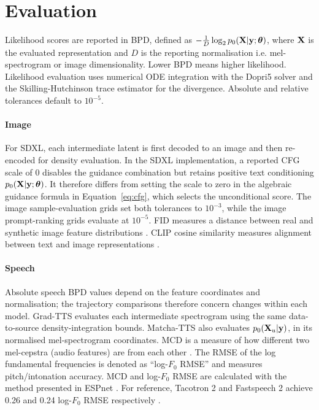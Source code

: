 \section{Evaluation}
Likelihood scores are reported in \ac{BPD}, defined as $-\frac{1}{D}\log_2 p_0({\mathbf{X}}|{\mathbf{y}};{\bm{\theta}})$, where ${\mathbf{X}}$ is the evaluated representation and $D$ is the reporting normalisation i.e. mel-spectrogram or image dimensionality. Lower \ac{BPD} means higher likelihood. 
Likelihood evaluation uses numerical \ac{ODE} integration with the Dopri5 solver and the Skilling-Hutchinson trace estimator for the divergence. Absolute and relative tolerances default to $10^{-5}$. 


\paragraph{Image}
For SDXL, each intermediate latent is first decoded to an image and then re-encoded for density evaluation. 
In the SDXL implementation, a reported \ac{CFG} scale of 0 disables the guidance combination but retains positive text conditioning $p_0({\mathbf{X}}|{\mathbf{y}};{\bm{\theta}})$. It therefore differs from setting the scale to zero in the algebraic guidance formula in Equation~\ref{eq:cfg}, which selects the unconditional score.
The image sample-evaluation grids set both tolerances to $10^{-3}$, while the image prompt-ranking grids evaluate at $10^{-5}$.
\ac{FID} measures a distance between real and synthetic image feature distributions \citep{heusel2017FID}. CLIP cosine similarity measures alignment between text and image representations \citep{radfordLearningTransferableVisual2021}.%

\paragraph{Speech}
Absolute speech \ac{BPD} values depend on the feature coordinates and normalisation; the trajectory comparisons therefore concern changes within each model.
Grad-TTS evaluates each intermediate spectrogram using the same data-to-source density-integration bounds. Matcha-TTS also evaluates $p_0({\mathbf{X}}_u|{\mathbf{y}})$, in its normalised mel-spectrogram coordinates. 
 \Ac{MCD} is a measure of how different two mel-cepstra (audio features) are from each other \citep{kominekSynthesizerVoiceQuality2008}. The \ac{RMSE} of the log fundamental frequencies is denoted as ``log-$F_0$ \ac{RMSE}'' and measures pitch/intonation accuracy. \Ac{MCD} and log-$F_0$ \ac{RMSE} are calculated with the method presented in ESPnet \citep{gaoEUROESPnetUnsupervised2023}. For reference, Tacotron 2 and Fastspeech 2 achieve 0.26 and 0.24 log-$F_0$ \ac{RMSE} respectively \citep{renFastSpeechFastHighQuality2022}.
 
